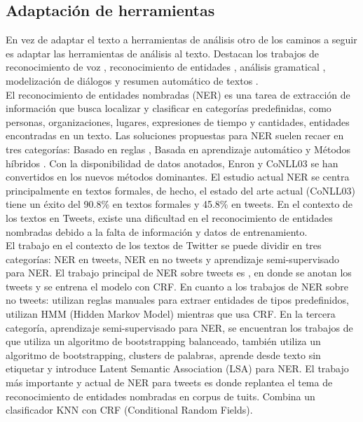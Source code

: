 \documentclass[spanish,12pt, a4paper,twoside]{paper}
\begin{document}
\subsection{Adaptación de herramientas}\label{sec:adaptaciondeherramientas}
En vez de adaptar el texto a herramientas de análisis otro de los caminos a seguir es adaptar las herramientas de análisis al texto. Destacan los trabajos de reconocimiento de voz \cite{gimpel:2011} \cite{owoputi:2013}, reconocimiento de entidades \cite{finin:2010} \cite{ritter:2011} \cite{liu:2011}, análisis gramatical \cite{foster:2011}, modelización de diálogos \cite{ritter:2010} y resumen automático de textos \cite{sharifi:2010}.\\

El reconocimiento de entidades nombradas (NER) es una tarea de extracción de información que busca localizar y clasificar en categorías predefinidas, como personas, organizaciones, lugares, expresiones de tiempo y cantidades, entidades encontradas en un texto. Las soluciones propuestas para NER suelen recaer en tres categorías: Basado en reglas \cite{krupkahausman:1998}, Basada en aprendizaje automático \cite{finkelmanning:2009} \cite{singh:2010} y Métodos híbridos \cite{jansche:2002}. Con la disponibilidad de datos anotados, Enron \cite{minkov:2005} y CoNLL03 \cite{tjong:2003} se han convertidos en los nuevos métodos dominantes. El estudio actual NER se centra principalmente en textos formales, de hecho, el estado del arte actual (CoNLL03) tiene un éxito del 90.8\% en textos formales y 45.8\% en tweets. En el contexto de los textos en Tweets, existe una dificultad en el reconocimiento de entidades nombradas debido a la falta de información y datos de entrenamiento.\\

El trabajo en el contexto de los textos de Twitter se puede dividir en tres categorías: NER en tweets, NER en no tweets y aprendizaje semi-supervisado para NER. El trabajo principal de NER sobre tweets es \cite{finin:2010}, en donde se anotan los tweets y se entrena el modelo con CRF. En cuanto a los trabajos de NER sobre no tweets: \cite{krupkahausman:1998} utilizan reglas manuales para extraer entidades de tipos predefinidos, \cite{zhousu:2002} utilizan HMM (Hidden Markov Model) mientras que \cite{finkel:2005} usa CRF. En la tercera categoría, aprendizaje semi-supervisado para NER, se encuentran los trabajos de \cite{jiangzhai:2007} que utiliza un algoritmo de bootstrapping balanceado, \cite{wu:2009} también utiliza un algoritmo de bootstrapping, \cite{miller:2004} clusters de palabras, \cite{brown:1992} aprende desde texto sin etiquetar y \cite{guo:2009} introduce Latent Semantic Association (LSA) para NER. El trabajo más importante y actual de NER para tweets es \cite{liu:2011} donde replantea el tema de reconocimiento de entidades nombradas en corpus de tuits. Combina un clasificador KNN con CRF (Conditional Random Fields).\\
\end{document}

